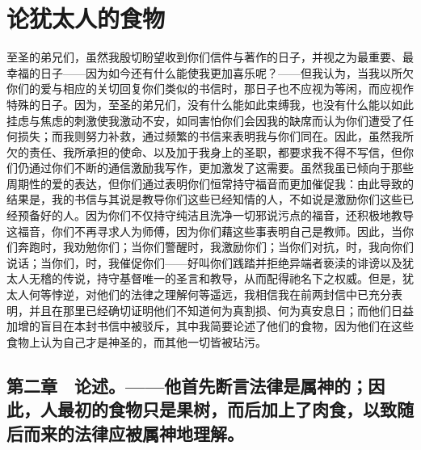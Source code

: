 
\chapter{论犹太人的食物}



至圣的弟兄们，虽然我殷切盼望收到你们信件与著作的日子，并视之为最重要、最幸福的日子——因为如今还有什么能使我更加喜乐呢？——但我认为，当我以所欠你们的爱与相应的关切回复你们类似的书信时，那日子也不应视为等闲，而应视作特殊的日子。因为，至圣的弟兄们，没有什么能如此束缚我，也没有什么能以如此挂虑与焦虑的刺激使我激动不安，如同害怕你们会因我的缺席而认为你们遭受了任何损失；而我则努力补救，通过频繁的书信来表明我与你们同在。因此，虽然我所欠的责任、我所承担的使命、以及加于我身上的圣职，都要求我不得不写信，但你们仍通过你们不断的通信激励我写作，更加激发了这需要。虽然我虽已倾向于那些周期性的爱的表达，但你们通过表明你们恒常持守福音而更加催促我：由此导致的结果是，我的书信与其说是教导你们这些已经知情的人，不如说是激励你们这些已经预备好的人。因为你们不仅持守纯洁且洗净一切邪说污点的福音，还积极地教导这福音，你们不再寻求人为师傅，因为你们藉这些事表明自己是教师。因此，当你们奔跑时，我劝勉你们；当你们警醒时，我激励你们；当你们对抗，时，我向你们说话；当你们，时，我催促你们——好叫你们践踏并拒绝异端者亵渎的诽谤以及犹太人无稽的传说，持守基督唯一的圣言和教导，从而配得祂名下之权威。但是，犹太人何等悖逆，对他们的法律之理解何等遥远，我相信我在前两封信中已充分表明，并且在那里已经确切证明他们不知道何为真割损、何为真安息日；而他们日益加增的盲目在本封书信中被驳斥，其中我简要论述了他们的食物，因为他们在这些食物上认为自己才是神圣的，而其他一切皆被玷污。\par


\section{第二章　论述。——他首先断言法律是属神的；因此，人最初的食物只是果树，而后加上了肉食，以致随后而来的法律应被属神地理解。}

